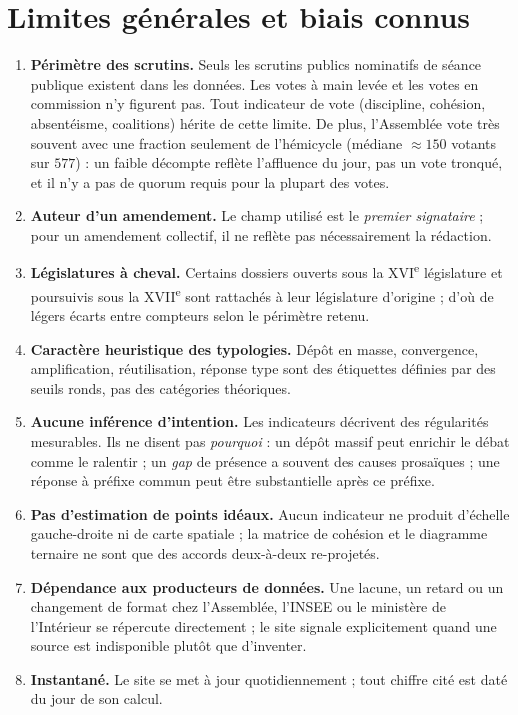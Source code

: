 \documentclass[11pt,a4paper]{article}
\begin{document}
\section{Limites générales et biais connus}\label{sec:limites}
\begin{enumerate}[label=L\arabic*.]
  \item \textbf{Périmètre des scrutins.} Seuls les scrutins publics nominatifs de
        séance publique existent dans les données. Les votes à main levée et les
        votes en commission n'y figurent pas. Tout indicateur de vote (discipline,
        cohésion, absentéisme, coalitions) hérite de cette limite. De plus,
        l'Assemblée vote très souvent avec une fraction seulement de l'hémicycle
        (médiane $\approx 150$ votants sur $577$) : un faible décompte reflète
        l'affluence du jour, pas un vote tronqué, et il n'y a pas de quorum requis
        pour la plupart des votes.
  \item \textbf{\og{}Auteur\fg{} d'un amendement.} Le champ utilisé est le
        \emph{premier signataire} ; pour un amendement collectif, il ne reflète pas
        nécessairement la rédaction.
  \item \textbf{Législatures à cheval.} Certains dossiers ouverts sous la
        XVI\textsuperscript{e} législature et poursuivis sous la XVII\textsuperscript{e}
        sont rattachés à leur législature d'origine ; d'où de légers écarts entre
        compteurs selon le périmètre retenu.
  \item \textbf{Caractère heuristique des typologies.} \og{}Dépôt en masse\fg{},
        \og{}convergence\fg{}, \og{}amplification\fg{}, \og{}réutilisation\fg{},
        \og{}réponse type\fg{} sont des étiquettes définies par des seuils ronds,
        pas des catégories théoriques.
  \item \textbf{Aucune inférence d'intention.} Les indicateurs décrivent des
        régularités mesurables. Ils ne disent pas \emph{pourquoi} : un dépôt massif
        peut enrichir le débat comme le ralentir ; un \emph{gap} de présence a
        souvent des causes prosaïques ; une réponse à préfixe commun peut être
        substantielle après ce préfixe.
  \item \textbf{Pas d'estimation de points idéaux.} Aucun indicateur ne produit
        d'échelle gauche-droite ni de carte spatiale ; la matrice de cohésion et le
        diagramme ternaire ne sont que des accords deux-à-deux re-projetés.
  \item \textbf{Dépendance aux producteurs de données.} Une lacune, un retard ou un
        changement de format chez l'Assemblée, l'INSEE ou le ministère de
        l'Intérieur se répercute directement ; le site signale explicitement quand
        une source est indisponible plutôt que d'inventer.
  \item \textbf{Instantané.} Le site se met à jour quotidiennement ; tout chiffre
        cité est daté du jour de son calcul.
\end{enumerate}
\end{document}
